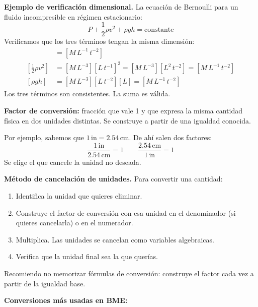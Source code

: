 \textbf{Ejemplo de verificación dimensional.} La ecuación de Bernoulli
para un fluido incompresible en régimen estacionario:
\[
P + \frac{1}{2}\rho v^2 + \rho g h = \text{constante}
\]
Verificamos que los tres términos tengan la misma dimensión:
\begin{align*}
[P] &= [M\,L^{-1}\,t^{-2}] \\[4pt]
\left[\frac{1}{2}\rho v^2\right] &= [M\,L^{-3}][L\,t^{-1}]^2
= [M\,L^{-3}][L^2\,t^{-2}] = [M\,L^{-1}\,t^{-2}] \\[4pt]
[\rho g h] &= [M\,L^{-3}][L\,t^{-2}][L] = [M\,L^{-1}\,t^{-2}]
\end{align*}
Los tres términos son consistentes. La suma es válida.

\textbf{Factor de conversión:} fracción que vale 1 y que expresa la
misma cantidad física en dos unidades distintas. Se construye a partir
de una igualdad conocida.

Por ejemplo, sabemos que $1\,\mathrm{in} = 2.54\,\mathrm{cm}$. De ahí
salen dos factores:
\[
\frac{1\,\mathrm{in}}{2.54\,\mathrm{cm}} = 1
\qquad
\frac{2.54\,\mathrm{cm}}{1\,\mathrm{in}} = 1
\]
Se elige el que cancele la unidad no deseada.

\textbf{Método de cancelación de unidades.} Para convertir una
cantidad:

\begin{enumerate}
    \item Identifica la unidad que quieres eliminar.
    \item Construye el factor de conversión con esa unidad en el
    denominador (si quieres cancelarla) o en el numerador.
    \item Multiplica. Las unidades se cancelan como variables
    algebraicas.
    \item Verifica que la unidad final sea la que querías.
\end{enumerate}

Recomiendo no memorizar fórmulas de conversión: construye el factor cada vez
a partir de la igualdad base.

\textbf{Conversiones más usadas en BME:}

